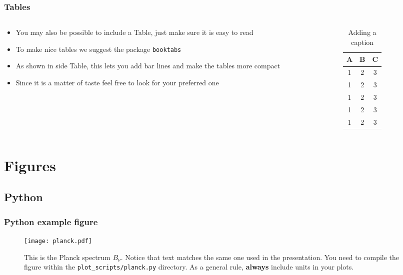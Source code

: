 \documentclass[
    10pt,
    aspectratio=169,
    xcolor={dvipsnames},
    spanish,
    ]{beamer}
\begin{document}
\begin{frame}
  \frametitle{Tables}
  \centering
  \begin{columns}
    \begin{column}{0.5\textwidth}
      \begin{itemize}
        \item You may also be possible to include a Table, just make sure it is easy to read
        \item To make nice tables we suggest the package \texttt{booktabs}
        \item As shown in side Table, this lets you add bar lines and make the tables more compact
        \item Since it is a matter of taste feel free to look for your preferred one
      \end{itemize}
    \end{column}
    \begin{column}{0.4\textwidth}
      \begin{table}[t]
        \centering
        \begin{tabular}{ccc}
            \toprule
            \textbf{A} & \textbf{B} & \textbf{C} \\ \midrule
            1 & 2 & 3 \\
            1 & 2 & 3 \\
            1 & 2 & 3 \\
            1 & 2 & 3 \\
            1 & 2 & 3 \\
            \bottomrule
        \end{tabular}
        \caption{Adding a caption}
    \end{table}
    \end{column}
  \end{columns}  
\end{frame}

\section{Figures}
\subsection{Python}
\begin{frame}
  \frametitle{Python example figure}
  \begin{figure}
    \centering
    \texttt{[image: planck.pdf]}
    \caption{This is the Planck spectrum $B_\nu$. Notice that text matches the same one used in the presentation. You need to compile the figure within the \texttt{plot\_scripts/planck.py} directory. As a general rule, \textbf{always} include units in your plots.}
  \end{figure}
\end{frame}
\end{document}
